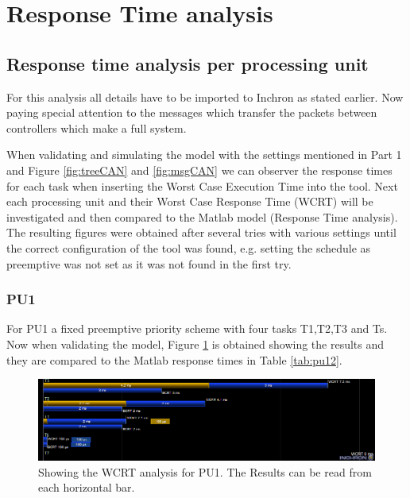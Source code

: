 \section{Response Time analysis}

\subsection{Response time analysis per processing unit}

For this analysis all details have to be imported to Inchron as stated earlier. Now paying special attention to the messages which transfer the packets between controllers which make a full system. 

When validating and simulating the model with the settings mentioned in Part 1 and Figure \ref{fig:treeCAN} and \ref{fig:msgCAN} we can observer the response times for each task when inserting the Worst Case Execution Time into the tool. Next each processing unit and their Worst Case Response Time (WCRT) will be investigated and then compared to the Matlab model (Response Time analysis). The resulting figures were obtained after several tries with various settings until the correct configuration of the tool was found, e.g. setting the schedule as preemptive was not set as it was not found in the first try.

\subsubsection{PU1}

For PU1 a fixed preemptive priority scheme with four tasks T1,T2,T3 and Ts. Now when validating the model, Figure \ref{fig:pu1rt} is obtained showing the results and they are compared to the Matlab response times in Table \ref{tab:pu12}.

\begin{figure}[h!]
	\begin{center}
		\includegraphics[width=\linewidth]{img/pu1-response-time}
		\caption{Showing the WCRT analysis for PU1. The Results can be read from each horizontal bar.}
		\label{fig:pu1rt}
	\end{center}
\end{figure}

